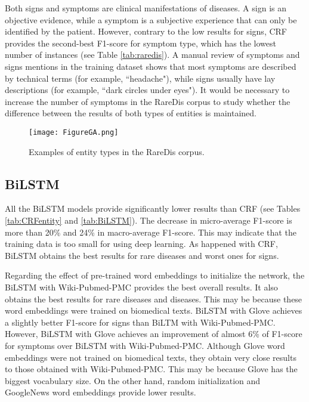 \documentclass[preprint,12pt]{elsarticle}
\begin{document}
Both signs and symptoms are clinical manifestations of diseases. A sign is an objective evidence, while a symptom is a subjective experience that can only be identified by the patient. However, contrary to the low results for signs, CRF provides the second-best F1-score for symptom type, which has the lowest number of instances (see Table \ref{tab:raredis}). A manual review of symptoms and signs mentions in the training dataset shows that most symptoms are described by technical terms (for example, ``headache"), while signs usually have lay descriptions (for example, ``dark circles under eyes"). It would be necessary to increase the number of symptoms in the RareDis corpus to study whether the difference between the results of both types of entities is maintained.



\begin{figure}
  \caption{Examples of entity types in the RareDis corpus.}
      \texttt{[image: FigureGA.png]}
     \label{fig:examples}
    \end{figure}

    
 \subsection{BiLSTM}


All the BiLSTM models provide significantly lower  results than CRF (see Tables  \ref{tab:CRFentity} and \ref{tab:BiLSTM}).
The decrease in micro-average F1-score is more than 20\% and 24\% in macro-average F1-score. 
This may indicate that the training data is too small for using deep learning. 
As happened with CRF, BiLSTM obtains the best results for rare diseases and worst ones for signs. 

Regarding the effect of pre-trained word embeddings to initialize the network, the BiLSTM with 
Wiki-Pubmed-PMC provides the best overall results. It also obtains the best results for rare diseases and diseases. This may be because these word embeddings were trained on biomedical texts. 
BiLSTM with Glove achieves a slightly better F1-score for signs than BiLTM with Wiki-Pubmed-PMC. However, BiLSTM with Glove achieves an improvement of almost 6\% of F1-score for symptoms over BiLSTM with Wiki-Pubmed-PMC. Although Glove word embeddings were not trained on biomedical texts, they obtain very close results to those obtained with Wiki-Pubmed-PMC. This may be because Glove has the biggest vocabulary size. 
On the other hand, random initialization and GoogleNews word embeddings provide lower results. 
\end{document}
